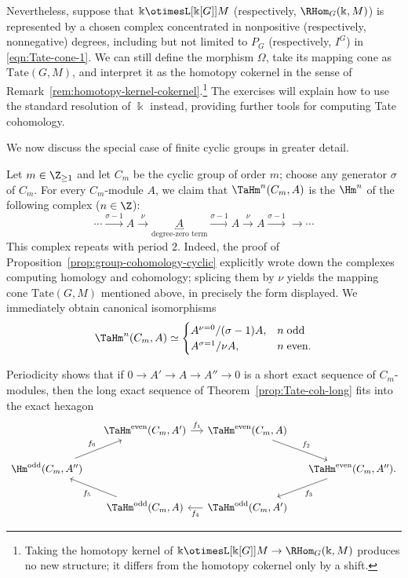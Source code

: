 Nevertheless, suppose that
$\Bbbk \otimesL[{\Bbbk[G]}] M$ (respectively, $\RHom_G(\Bbbk,M)$) is
represented by a chosen complex concentrated in nonpositive (respectively,
nonnegative) degrees, including but not limited to $P_G$ (respectively, $I^G$)
in \eqref{eqn:Tate-cone-1}. We can still define the morphism $\Omega$, take
its mapping cone as $\mathrm{Tate}(G,M)$, and interpret it as the homotopy
cokernel in the sense of Remark~\ref{rem:homotopy-kernel-cokernel}.\footnote{Taking
the homotopy kernel of
$\Bbbk \otimesL[{\Bbbk[G]}] M \to \RHom_G(\Bbbk, M)$ produces no new
structure; it differs from the homotopy cokernel only by a shift.} The
exercises will explain how to use the standard resolution of $\Bbbk$ instead,
providing further tools for computing Tate cohomology.

We now discuss the special case of finite cyclic groups in greater detail.

\begin{example}\label{eg:TaHm-periodic}
	Let $m\in\Z_{\geq1}$ and let $C_m$ be the cyclic group of order $m$;
	choose any generator $\sigma$ of $C_m$. For every $C_m$-module $A$, we
	claim that $\TaHm^n(C_m,A)$ is the $\Hm^n$ of the following complex
	($n\in\Z$):
	\[ \cdots \xrightarrow{\sigma-1} A \xrightarrow{\nu} \underbracket{A}_{\text{degree-zero term}} \xrightarrow{\sigma-1} A \xrightarrow{\nu} A \xrightarrow{\sigma-1} \to \cdots \]
	This complex repeats with period $2$. Indeed, the proof of
	Proposition~\ref{prop:group-cohomology-cyclic} explicitly wrote down the
	complexes computing homology and cohomology; splicing them by $\nu$ yields
	the mapping cone $\mathrm{Tate}(G,M)$ mentioned above, in precisely the
	form displayed. We immediately obtain canonical isomorphisms
	\[ \TaHm^n(C_m, A) \simeq \begin{cases}
		A^{\nu=0} / (\sigma-1) A, & n\;\text{odd} \\
		A^{\sigma=1} / \nu A, & n\;\text{even}.
	\end{cases}\]

	Periodicity shows that if
	$0\to A'\to A\to A''\to0$ is a short exact sequence of $C_m$-modules,
	then the long exact sequence of Theorem~\ref{prop:Tate-coh-long} fits into
	the exact hexagon
	\begin{equation}\label{eqn:Herbrand-hexagon}
		\begin{tikzcd}[column sep=small]
			& \TaHm^{\text{even}}(C_m, A') \arrow[r, "f_1"] & \TaHm^{\text{even}}(C_m, A) \arrow[rd, "f_2"] & \\
			\Hm^{\text{odd}}(C_m, A'') \arrow[ru, "f_6"] & & & \TaHm^{\text{even}}(C_m, A'') \arrow[ld, "f_3"] . \\
			& \TaHm^{\text{odd}}(C_m, A) \arrow[lu, "f_5"] & \TaHm^{\text{odd}}(C_m, A') \arrow[l, "f_4"] &
		\end{tikzcd}
	\end{equation}
\end{example}

